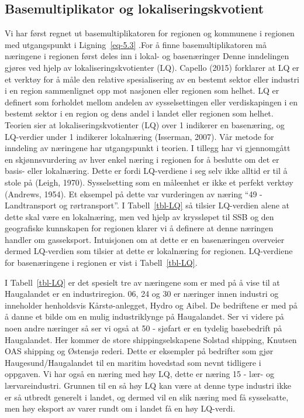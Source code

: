 \documentclass[
]{article}
\begin{document}
\hypertarget{basemultiplikator-og-lokaliseringskvotient}{%
\subsection{Basemultiplikator og
lokaliseringskvotient}\label{basemultiplikator-og-lokaliseringskvotient}}

Vi har først regnet ut basemultiplikatoren for regionen og kommunene i
regionen med utgangspunkt i Ligning~\ref{eq-5.3} .For å finne
basemultiplikatoren må næringene i regionen først deles inn i lokal- og
basenæringer Denne inndelingen gjøres ved hjelp av
lokaliseringskvotienter (LQ). Capello (2015) forklarer at LQ er et
verktøy for å måle den relative spesialisering av en bestemt sektor
eller industri i en region sammenlignet opp mot nasjonen eller regionen
som helhet. LQ er definert som forholdet mellom andelen av
sysselsettingen eller verdiskapingen i en bestemt sektor i en region og
dens andel i landet eller regionen som helhet. Teorien sier at
lokaliseringskvotienter (LQ) over 1 indikerer en basenæring, og
LQ-verdier under 1 indikerer lokalnæring (Isserman, 2007). Vår metode
for inndeling av næringene har utgangspunkt i teorien. I tillegg har vi
gjennomgått en skjønnsvurdering av hver enkel næring i regionen for å
beslutte om det er basis- eller lokalnæring. Dette er fordi LQ-verdiene
i seg selv ikke alltid er til å stole på (Leigh, 1970). Sysselsetting
som en måleenhet er ikke et perfekt verktøy (Andrews, 1954). Et eksempel
på dette var vurderingen av næring ``49 - Landtransport og
rørtransport''. I Tabell~\ref{tbl-LQ} så tilsier LQ-verdien alene at
dette skal være en lokalnæring, men ved hjelp av kryssløpet til SSB og
den geografiske kunnskapen for regionen klarer vi å definere at denne
næringen handler om gasseksport. Intuisjonen om at dette er en
basenæringen overveier dermed LQ-verdien som tilsier at dette er
lokalnæring for regionen. LQ-verdiene for basenæringene i regionen er
vist i Tabell~\ref{tbl-LQ}.

I Tabell~\ref{tbl-LQ} er det spesielt tre av næringene som er med på å
vise til at Haugalandet er en industriregion. 06, 24 og 30 er næringer
innen industri og inneholder henholdsvis Kårstø-anlegget, Hydro og
Aibel. De bedriftene er med på å danne et bilde om en mulig
industriklynge på Haugalandet. Ser vi videre på noen andre næringer så
ser vi også at 50 - sjøfart er en tydelig basebedrift på Haugalandet.
Her kommer de store shippingselskapene Solstad shipping, Knutsen OAS
shipping og Østensjø rederi. Dette er eksempler på bedrifter som gjør
Haugesund/Haugalandet til en maritim hovedstad som nevnt tidligere i
oppgaven. Vi har også en næring med høy LQ, dette er næring 15 - lær- og
lærvareindustri. Grunnen til en så høy LQ kan være at denne type
industri ikke er så utbredt generelt i landet, og dermed vil en slik
næring med få sysselsatte, men høy eksport av varer rundt om i landet få
en høy LQ-verdi.
\end{document}
